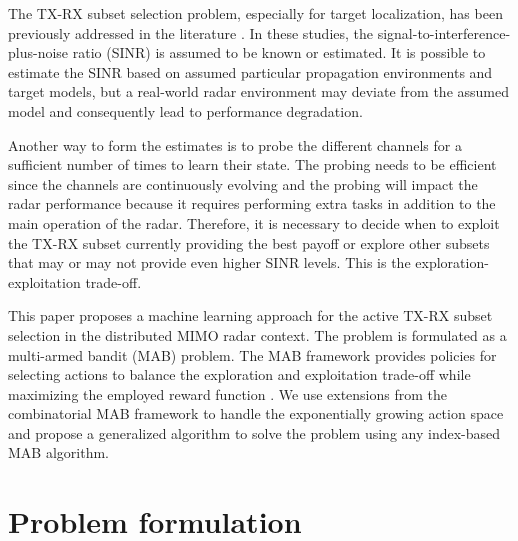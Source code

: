 \documentclass[conference]{IEEEtran}
\begin{document}
The TX-RX subset selection problem, especially for target localization, has been previously addressed in the literature \cite{Godrich2011, Sun2014}.
In these studies, the signal-to-interference-plus-noise ratio (SINR) is assumed to be known or estimated.
It is possible to estimate the SINR based on assumed particular propagation environments and target models, but a real-world radar environment may deviate from the assumed model and consequently lead to performance degradation.

Another way to form the estimates is to probe the different channels for a sufficient number of times to learn their state. 
The probing needs to be efficient since the channels are continuously evolving and the probing will impact the radar performance because it requires performing extra tasks in addition to the main operation of the radar.  Therefore, it is necessary to decide when to exploit the TX-RX subset currently providing the best payoff or explore other subsets that may or may not provide even higher SINR levels. 
This is the exploration-exploitation trade-off.

This paper proposes a machine learning approach for the active TX-RX subset selection in the distributed MIMO radar context.
The problem is formulated as a multi-armed bandit (MAB) problem. 
The MAB framework provides policies for selecting actions to balance the exploration and exploitation trade-off while maximizing the employed reward function \cite{Lattimore2019}.
We use extensions from the combinatorial MAB framework to handle the exponentially growing action space and propose a generalized algorithm to solve the problem using any index-based MAB algorithm.



\section{Problem formulation}
\end{document}
